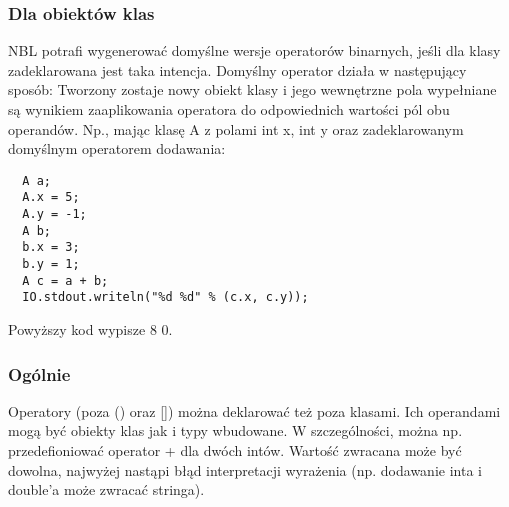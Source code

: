 \documentclass[a4paper,10pt]{scrartcl}
\begin{document}
\subsubsection{Dla obiektów klas}
NBL potrafi wygenerować domyślne wersje operatorów binarnych, jeśli dla klasy zadeklarowana jest taka intencja. Domyślny operator działa w następujący
sposób: Tworzony zostaje nowy obiekt klasy i jego wewnętrzne pola wypełniane są wynikiem zaaplikowania operatora do odpowiednich wartości pól obu
operandów. Np., mając klasę A z polami int x, int y oraz zadeklarowanym domyślnym operatorem dodawania:

\begin{lstlisting}
  A a;
  A.x = 5;
  A.y = -1;
  A b;
  b.x = 3;
  b.y = 1;
  A c = a + b;
  IO.stdout.writeln("%d %d" % (c.x, c.y));
\end{lstlisting}

Powyższy kod wypisze 8 0.

\subsubsection{Ogólnie}
Operatory (poza () oraz []) można deklarować też poza klasami. Ich operandami mogą być obiekty klas jak i typy wbudowane. W szczególności, można np.
przedefioniować operator + dla dwóch intów. Wartość zwracana może być dowolna, najwyżej nastąpi błąd interpretacji wyrażenia (np. dodawanie inta i
double'a może zwracać stringa).
\end{document}
